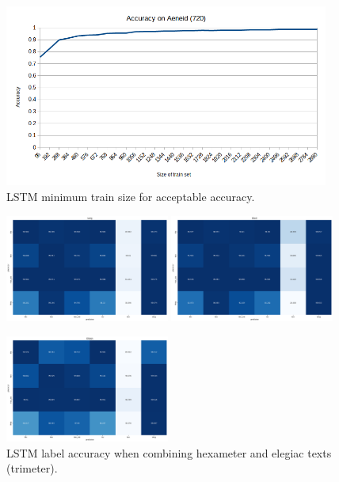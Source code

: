 \begin{figure}[H]
    \centering
    \includegraphics[width=0.95\textwidth]{img/lstm/lstm_minimum_train_set.png}

    \caption{LSTM minimum train size for acceptable accuracy.}
    \label{fig:exp_architecture}
\end{figure}

\begin{figure}[H]
    \centering
    \includegraphics[width=0.48\textwidth]{img/lstm/lstm_cross_system_label_accuracy_long.png}
    \quad
    \includegraphics[width=0.48\textwidth]{img/lstm/lstm_cross_system_label_accuracy_short.png}

    \includegraphics[width=0.48\textwidth]{img/lstm/lstm_cross_system_label_accuracy_elision.png}

		\caption{LSTM label accuracy when combining hexameter and elegiac texts (trimeter).}
    \label{fig:exp_architecture}
\end{figure}
